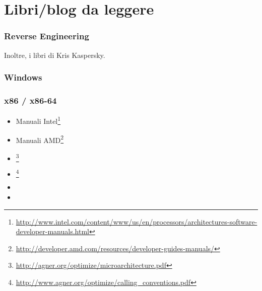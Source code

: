 \chapter{Libri/blog da leggere}


\subsection{Reverse Engineering}




Inoltre, i libri di Kris Kaspersky.

\subsection{Windows}



\subsection{\CCpp}



\subsection{x86 / x86-64}

\label{x86_manuals}
\begin{itemize}
\item Manuali Intel\footnote{\AlsoAvailableAs \url{http://www.intel.com/content/www/us/en/processors/architectures-software-developer-manuals.html}}

\item Manuali AMD\footnote{\AlsoAvailableAs \url{http://developer.amd.com/resources/developer-guides-manuals/}}

\item \AgnerFog{}\footnote{\AlsoAvailableAs \url{http://agner.org/optimize/microarchitecture.pdf}}

\item \AgnerFogCC{}\footnote{\AlsoAvailableAs \url{http://www.agner.org/optimize/calling_conventions.pdf}}

\item \IntelOptimization

\item \AMDOptimization
\end{itemize}

